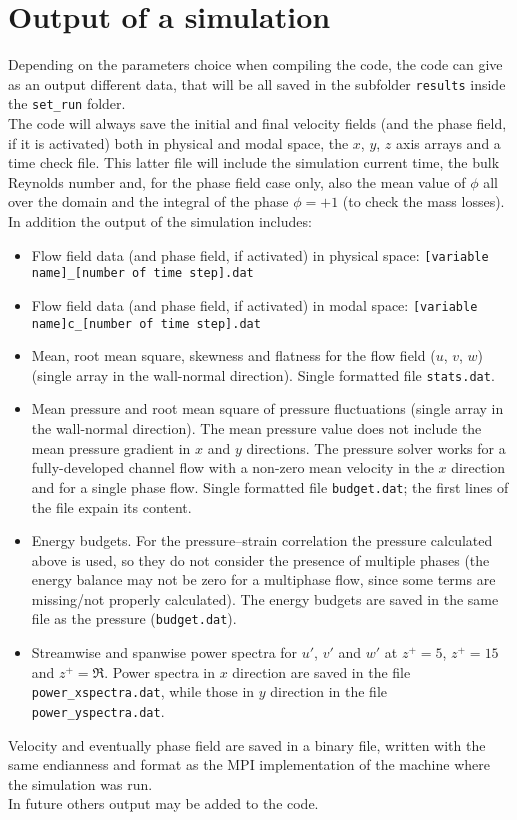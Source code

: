 \section{Output of a simulation}
Depending on the parameters choice when compiling the code, the code can give as an output different data, that will be all saved in the subfolder \texttt{results} inside the \texttt{set\_run} folder.\\
The code will always save the initial and final velocity fields (and the phase field, if it is activated) both in physical and modal space, the $x$, $y$, $z$ axis arrays and a time check file. This latter file will include the simulation current time, the bulk Reynolds number and, for the phase field case only, also the mean value of $\phi$ all over the domain and the integral of the phase $\phi=+1$ (to check the mass losses).\\
In addition the output of the simulation includes:
\begin{itemize}
\item Flow field data (and phase field, if activated) in physical space: \texttt{[variable name]\_[number of time step].dat}
\item Flow field data (and phase field, if activated) in modal space: \texttt{[variable name]c\_[number of time step].dat}
\item Mean, root mean square, skewness and flatness for the flow field ($u$, $v$, $w$) (single array in the wall-normal direction). Single formatted file \texttt{stats.dat}.
\item Mean pressure and root mean square of pressure fluctuations (single array in the wall-normal direction). The mean pressure value does not include the mean pressure gradient in $x$ and $y$ directions. The pressure solver works for a fully-developed channel flow with a non-zero mean velocity in the $x$ direction and for a single phase flow. Single formatted file \texttt{budget.dat}; the first lines of the file expain its content.
\item Energy budgets. For the pressure--strain correlation the pressure calculated above is used, so they do not consider the presence of multiple phases (the energy balance may not be zero for a multiphase flow, since some terms are missing/not properly calculated). The energy budgets are saved in the same file as the pressure (\texttt{budget.dat}).
\item Streamwise and spanwise power spectra for $u'$, $v'$ and $w'$ at $z^+=5$, $z^+=15$ and $z^+=\Re$. Power spectra in $x$ direction are saved in the file \texttt{power\_xspectra.dat}, while those in $y$ direction in the file \texttt{power\_yspectra.dat}.
\end{itemize}
Velocity and eventually phase field are saved in a binary file, written with the same endianness and format as the MPI implementation of the machine where the simulation was run.\\
In future others output may be added to the code.

